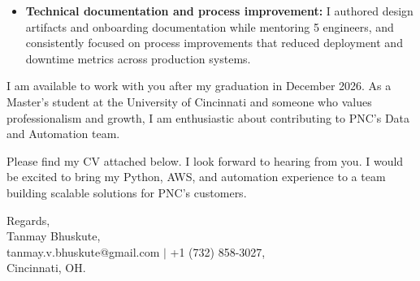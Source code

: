\documentclass[11pt]{letter}
\begin{document}
\begin{letter}{}
\begin{itemize}[leftmargin=*, itemsep=0.45em]
    \item \textbf{Technical documentation and process improvement:} I authored design artifacts and onboarding documentation while mentoring 5 engineers, and consistently focused on process improvements that reduced deployment and downtime metrics across production systems.
\end{itemize}

I am available to work with you after my graduation in December 2026. As a Master's student at the University of Cincinnati and someone who values professionalism and growth, I am enthusiastic about contributing to PNC's Data and Automation team.

Please find my CV attached below. I look forward to hearing from you. I would be excited to bring my Python, AWS, and automation experience to a team building scalable solutions for PNC's customers.

{\setlength{\parskip}{0pt}
Regards,\\
Tanmay Bhuskute,\\
tanmay.v.bhuskute@gmail.com $\mid$ +1 (732) 858-3027,\\
Cincinnati, OH.
}

\end{letter}
\end{document}
